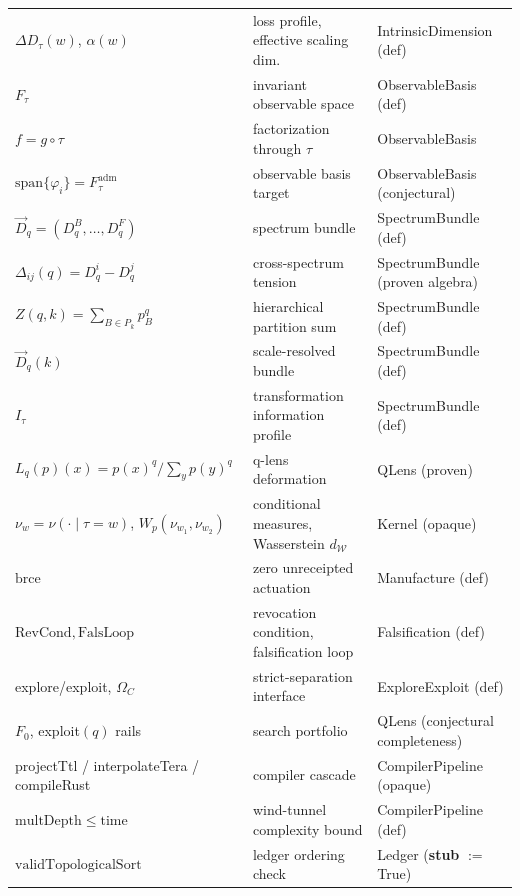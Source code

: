 \documentclass[11pt]{article}
\newcommand{\tmap}{\tau}                       %
\newcommand{\dW}{d_{\mathcal{W}}}
\theoremstyle{plain}
\theoremstyle{definition}
\begin{document}
\begin{longtable}{@{}lll@{}}
$\Delta D_\tmap(w)$, $\alpha(w)$ & loss profile, effective scaling dim.\ & IntrinsicDimension (def) \\
$F_\tmap$ & invariant observable space & ObservableBasis (def) \\
$f = g \circ \tmap$ & factorization through $\tmap$ & ObservableBasis \\
$\mathrm{span}\{\varphi_i\} = F^{\mathrm{adm}}_\tmap$ & observable basis target & ObservableBasis (conjectural) \\
$\vec{D}_q = (D_q^B, \dots, D_q^F)$ & spectrum bundle & SpectrumBundle (def) \\
$\Delta_{ij}(q) = D_q^i - D_q^j$ & cross-spectrum tension & SpectrumBundle (proven algebra) \\
$Z(q,k) = \sum_{B \in P_k} p_B^q$ & hierarchical partition sum & SpectrumBundle (def) \\
$\vec{D}_q(k)$ & scale-resolved bundle & SpectrumBundle (def) \\
$I_\tmap$ & transformation information profile & SpectrumBundle (def) \\
$L_q(p)(x) = p(x)^q / \sum_y p(y)^q$ & q-lens deformation & QLens (proven) \\
$\nu_w = \nu(\cdot \mid \tmap = w)$, $W_p(\nu_{w_1}, \nu_{w_2})$ & conditional measures, Wasserstein $\dW$ & Kernel (opaque) \\
$\mathrm{brce}$ & zero unreceipted actuation & Manufacture (def) \\
$\mathrm{RevCond}, \mathrm{FalsLoop}$ & revocation condition, falsification loop & Falsification (def) \\
explore/exploit, $\Omega_C$ & strict-separation interface & ExploreExploit (def) \\
$F_0$, exploit$(q)$ rails & search portfolio & QLens (conjectural completeness) \\
projectTtl / interpolateTera / compileRust & compiler cascade & CompilerPipeline (opaque) \\
$\mathrm{multDepth} \le \mathrm{time}$ & wind-tunnel complexity bound & CompilerPipeline (def) \\
$\mathrm{validTopologicalSort}$ & ledger ordering check & Ledger (\textbf{stub} $:=$ True) \\
\bottomrule
\end{longtable}
\end{document}
